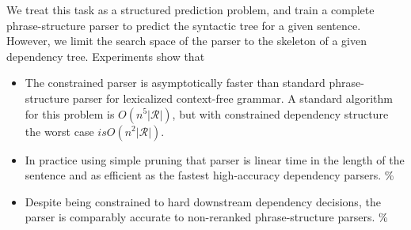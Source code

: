 \documentclass[11pt,letterpaper]{article}
\newcommand{\rules}{\mathcal{R}}
\begin{document}
We treat this task as a  structured prediction problem,
and train a complete phrase-structure parser to predict the
syntactic tree for a given sentence. However, we limit the
search space of the parser to the skeleton of a given dependency
tree. Experiments show that





\begin{itemize}
\item The constrained parser is asymptotically  faster than
standard phrase-structure parser for lexicalized context-free grammar.
A standard algorithm for this problem is $O(n^5 |\rules|)$, but with
constrained dependency structure the worst case $is O(n^2 |\rules|)$.

\item In practice using simple pruning that parser is
linear time in the length of the sentence and as efficient as the fastest
high-accuracy dependency parsers. \%

\item Despite being constrained to hard downstream dependency decisions,
the parser is comparably accurate to non-reranked phrase-structure parsers. \%



\end{itemize}











\end{document}
